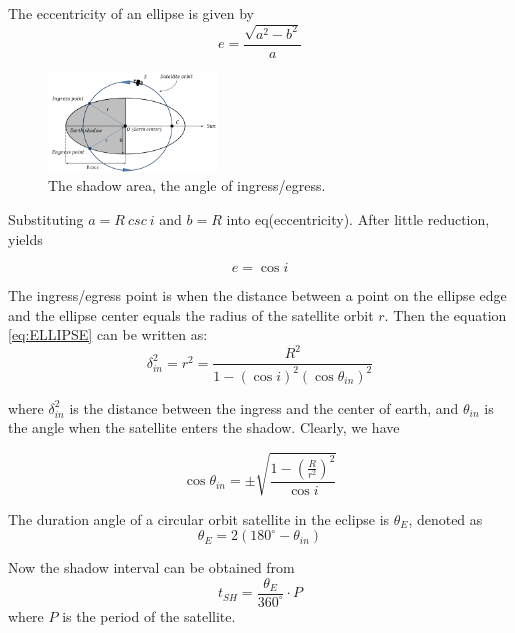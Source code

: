 The eccentricity of an ellipse is given by
\begin{equation}
 e=\frac{\sqrt{a^{2}-b^{2}}}{a}
 \label{eq:ECCENTRICITY}
\end{equation}

\begin{figure}[H]
	\centering
	\includegraphics[scale=0.9,clip, width=0.4\textwidth]{fig/ellipse.png}	
	\caption{The shadow area, the angle of ingress/egress.}
	\label{fig:ELLIPSE}
\end{figure}

Substituting $a=R\ csc\ i$ and $b=R$ into eq(eccentricity). After little reduction, yields 

\begin{equation}
 e=\cos i 
\end{equation}

The ingress/egress point is when the distance between a point on the ellipse edge and the ellipse center equals the radius of the satellite orbit $r$.
Then the equation  \ref{eq:ELLIPSE} can be written as:
\begin{equation}
 \delta_{i n}^{2}=r^{2}=\frac{R^{2}}{1-(\cos i)^{2}\left(\cos \theta_{i n}\right)^{2}} 
\end{equation}

where $\delta^2_{in}$ is the distance between the ingress and the center of earth, and $\theta_{in}$ is the angle when the satellite enters the shadow. Clearly, we have

\begin{equation}
 \cos \theta_{i n}=\pm \sqrt{\frac{1-\left(\frac{R}{r^{2}}\right)^{2}}{\cos i}} 
\end{equation}

The duration angle of a circular orbit satellite in the eclipse is $\theta_E$, denoted as
\begin{equation}
 \theta_{E}=2\left(180^{\circ}-\theta_{i n}\right) 
 \label{eq:DURATONANGLE}
\end{equation}

Now the shadow interval can be obtained from
\begin{equation}
 t_{S H}=\frac{\theta_{E}}{360^{\circ}} \cdot P 
 \label{eq:SHADOWINTERVAL}
\end{equation}
where $P$ is the period of the satellite.

